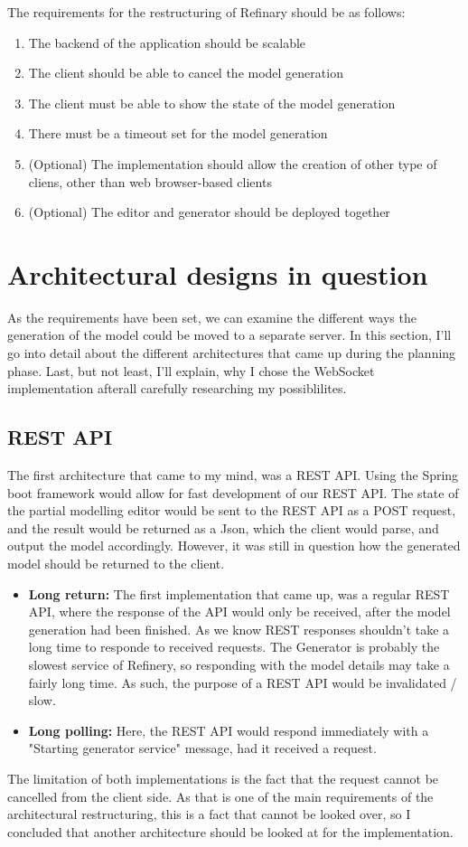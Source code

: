 The requirements for the restructuring of Refinary should be as follows:
\begin{enumerate}
        \item The backend of the application should be scalable 
        \item The client should be able to cancel the model generation
        \item The client must be able to show the state of the model generation  
        \item There must be a timeout set for the model generation
		\item (Optional) The implementation should allow the creation of other type of cliens,
		other than web browser-based clients
		\item (Optional) The editor and generator should be deployed together
\end{enumerate}

\section{Architectural designs in question}
As the requirements have been set, we can examine the different ways the generation of the model could be
moved to a separate server. In this section, I'll go into detail about the different architectures that came up during
the planning phase. Last, but not least, I'll explain, why I chose the WebSocket implementation afterall carefully researching
my possiblilites.

\subsection{REST API}
The first architecture that came to my mind, was a REST API. Using the Spring boot framework would allow for fast development
of our REST API. The state of the partial modelling editor would be sent to the REST API as a POST request, and the result
would be returned as a Json, which the client would parse, and output the model accordingly. However, it was still in question
how the generated model should be returned to the client.
\begin{itemize}
        \item \textbf{Long return:}
		The first implementation that came up, was a regular REST API, where the response of the API would only be received, after
		the model generation had been finished. As we know REST responses shouldn't take a long time to responde to received requests.
		The Generator is probably the slowest service of Refinery, so responding with the model details may take a fairly long time.
		As such, the purpose of a REST API would be invalidated / slow.
		\item \textbf{Long polling:}
		Here, the REST API would respond immediately with a "Starting generator service" message, had it received a request.
\end{itemize}
The limitation of both implementations is the fact that the request cannot be cancelled from the client side. As that is one 
of the main requirements of the architectural restructuring, this is a fact that cannot be looked over, so I concluded that 
another architecture should be looked at for the implementation.


